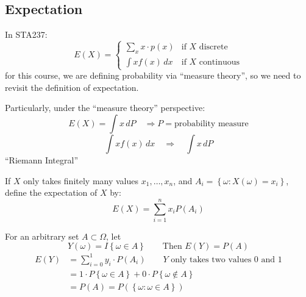 
\newlecture[Expectation][Sep 22, 2026]
\subsection{Expectation}

In STA237:
\[E(X) = \begin{cases*}
    \sum_{x}^{}x\cdot p(x) &\text{if } X \text{ discrete}\\
    \int xf(x)\,dx &\text{if } X \text{ continuous}
\end{cases*}\]
for this course, we are defining probability via ``measure theory'', so we need to revisit the definition of expectation.

Particularly, under the ``measure theory'' perspective:
\[E(X) = \int x\, dP \quad \Rightarrow P = \text{probability measure}\]
\[\int xf(x)\,dx \quad \Rightarrow \quad \int x\, dP\]
``Riemann Integral''

\begin{definition}
    If $X$ only takes finitely many values $x_1, \dots, x_n$, and $A_i = \left\{\omega: X(\omega) = x_i\right\}$, define the expectation of $X$ by:
    \[E(X) = \sum_{i=1}^{n}x_i P(A_i)\]
\end{definition}

\begin{example}[][5.1.1]
    For an arbitrary set $A \subset \Omega$, let
    \[Y(\omega) = I\left\{\omega \in A\right\} \qquad \text{Then } E(Y) = P(A)\]
    \begin{align*}
        E(Y) &= \sum_{i=0}^{1}y_i \cdot P(A_i) \qquad Y\text{ only takes two values 0 and 1}\\
        &= 1 \cdot P\left\{\omega \in A\right\} + 0\cdot P\left\{\omega \notin A\right\}\\
        &= P(A) = P(\left\{\omega: \omega \in A\right\})
    \end{align*}
\end{example}


